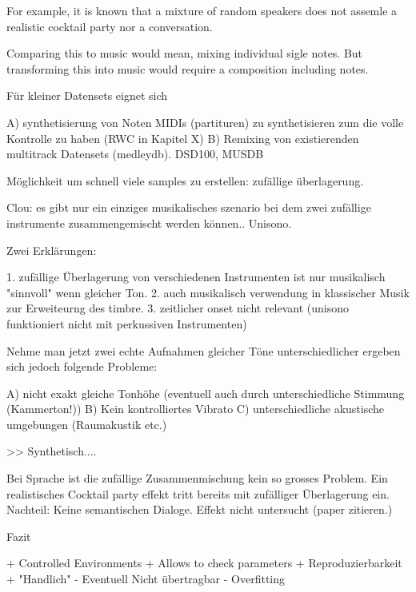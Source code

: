For example, it is known that a mixture of random speakers does not assemle a realistic cocktail party nor a conversation.

Comparing this to music would mean, mixing individual sigle notes. But transforming this into music would require a composition including notes.


Für kleiner Datensets eignet sich

A) synthetisierung von Noten MIDIs (partituren) zu synthetisieren zum die volle Kontrolle zu haben (RWC in Kapitel X)
B) Remixing von existierenden multitrack Datensets (medleydb). DSD100, MUSDB

Möglichkeit um schnell viele samples zu erstellen: zufällige überlagerung.

Clou: es gibt nur ein einziges musikalisches szenario bei dem zwei zufällige instrumente zusammengemischt werden können.. Unisono.

Zwei Erklärungen:

1. zufällige Überlagerung von verschiedenen Instrumenten ist nur musikalisch "sinnvoll" wenn gleicher Ton.
2. auch musikalisch verwendung in klassischer Musik zur Erweiteurng des timbre.
3. zeitlicher onset nicht relevant (unisono funktioniert nicht mit perkussiven Instrumenten)

Nehme man jetzt zwei echte Aufnahmen gleicher Töne unterschiedlicher ergeben sich jedoch folgende Probleme:

A) nicht exakt gleiche Tonhöhe (eventuell auch durch unterschiedliche Stimmung (Kammerton!))
B) Kein kontrolliertes Vibrato
C) unterschiedliche akustische umgebungen (Raumakustik etc.)

>> Synthetisch....

Bei Sprache ist die zufällige Zusammenmischung kein so grosses Problem. Ein realistisches Cocktail party effekt tritt bereits mit zufälliger Überlagerung ein. Nachteil: Keine semantischen Dialoge. Effekt nicht untersucht (paper zitieren.)

Fazit

+ Controlled Environments
+ Allows to check parameters
+ Reproduzierbarkeit
+ "Handlich"
- Eventuell Nicht übertragbar
- Overfitting

